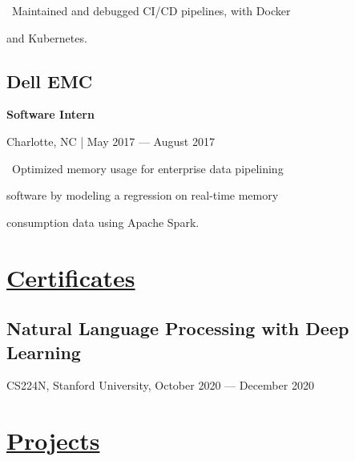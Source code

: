 \documentclass{article}
\begin{document}
\begin{minipage}[t]{0.45\textwidth\hspace{0in}}
\begin{minipage}[t]{3.75in\textwidth\hspace{0in}}
            \vspace{0.3em}
            \hspace{1em}\textasteriskcentered \, \mdseries\textrm{Maintained and debugged CI/CD pipelines, with Docker}

            \hspace{1.6em} and Kubernetes.
        \end{minipage}

        \vspace{0.3em}
        \subsection{Dell EMC}
        \vspace{-0.5em}\hspace{0.1em}
        \mdseries\bfseries{Software Intern}
        \vspace{0.1em}
        
        \hspace{0.5em}\mdseries\textrm{Charlotte, NC | May 2017 — August 2017}

        \vspace{-0.4em}
        \begin{minipage}[t]{3.75in\textwidth\hspace{0in}}
            \vspace{0.1em}
            \hspace{1em}\textasteriskcentered \, \mdseries\textrm{Optimized memory usage for enterprise data pipelining} 
            
            \hspace{1.6em} software by modeling a regression on real-time memory 
            
            \hspace{1.6em} consumption data using Apache Spark.
        \end{minipage}

        \section{\underline{Certificates}}
        \subsection{Natural Language Processing with Deep Learning}
        \mdseries\textrm{CS224N, Stanford University, October 2020 — December 2020}

        \section{\underline{Projects}}
\end{minipage}
\end{document}
